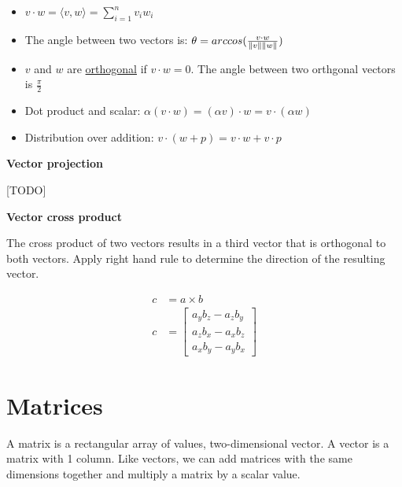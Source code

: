 \documentclass[../main.tex]{subfiles}
\begin{document}
  \begin{itemize}
  \item $v \cdot w = \langle v, w \rangle = \sum_{i=1}^{n} v_{i}w_{i}$

  \item The angle between two vectors is: $\theta = arccos(\frac{v \cdot w}{\left\|v\right\|\left\|w\right\|})$

  \item $v$ and $w$ are \underline{orthogonal} if $v \cdot w = 0$. The angle between two orthgonal vectors is $\frac{\pi}{2}$

  \item Dot product and scalar: $\alpha (v \cdot w) = (\alpha v) \cdot w = v \cdot (\alpha w)$

  \item Distribution over addition: $v \cdot (w + p) = v \cdot w + v \cdot p$
  \end{itemize}

  \textbf{Vector projection}

  [TODO]

  \textbf{Vector cross product}

  The cross product of two vectors results in a third vector that is orthogonal to both vectors. Apply right hand rule to determine the direction of the resulting vector.

  \begin{align*}
  c &= a \times b \\
  c &= \begin{bmatrix} a_{y}b_{z} - a_{z}b_{y} \\ a_{z}b_{x} - a_{x}b_{z} \\ a_{x}b_{y} - a_{y}b_{x}\end{bmatrix}
  \end{align*}

  \section{Matrices}

  A matrix is a rectangular array of values, two-dimensional vector. A vector is a matrix with 1 column. Like vectors, we can add matrices with the same dimensions together and multiply a matrix by a scalar value.
\end{document}
